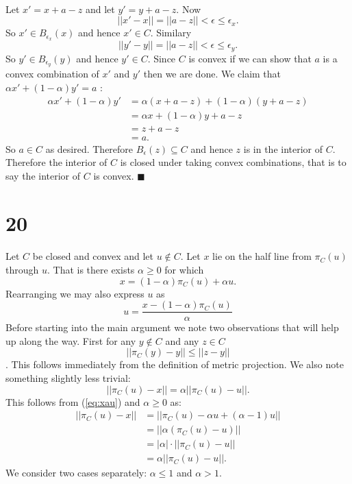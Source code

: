 \documentclass[letterpaper,12pt,oneside,onecolumn]{article}
\begin{document}
\paragraph{}
Let $x' = x + a-z$ and let $y' = y + a - z$. Now $$||x' - x|| = ||a-z|| < \epsilon \leq \epsilon_x.$$ So $x' \in B_{\epsilon_x}(x)$ and hence $x' \in C$. Similary $$||y'-y|| = ||a-z|| < \epsilon \leq \epsilon_y.$$ So $y' \in B_{\epsilon_y}(y)$ and hence $y' \in C$. Since $C$ is convex if we can show that $a$ is a convex combination of $x'$ and $y'$ then we are done. We claim that $\alpha x' + (1-\alpha)y' = a$ :
\begin{align*}
\alpha x' + (1-\alpha)y' &= \alpha(x + a - z) + (1-\alpha)(y+a-z) \\
&= \alpha x + (1-\alpha)y + a - z \\
&= z + a -z \\
&= a.
\end{align*}
So $a \in C$ as desired. Therefore $B_\epsilon(z) \subseteq C$ and hence $z$ is in the interior of $C$. Therefore the interior of $C$ is closed under taking convex combinations, that is to say the interior of $C$ is convex. $\blacksquare$
\section*{20}
\paragraph{}
Let $C$ be closed and convex and let $u \not\in C$. Let $x$ lie on the half line from $\pi_C(u)$ through $u$. That is there exists $\alpha \geq 0$ for which \begin{equation} x = (1-\alpha)\pi_C(u) + \alpha u. \label{eq:xau}\end{equation}
Rearranging we may also express $u$ as
\begin{equation} u = \frac{x - (1-\alpha) \pi_C(u)}{\alpha} \label{eq:uax}\end{equation}
Before starting into the main argument we note two observations that will help up along the way. First for any $y \not\in C$ and any $z \in C$
\begin{equation}
||\pi_C(y) - y|| \leq ||z - y||
\label{ineq:minproj}\end{equation}
. This follows immediately from the definition of metric projection. We also note something slightly less trivial:
\begin{equation}
||\pi_C(u) - x || = \alpha ||\pi_C(u) - u||. \label{eq:alphau}
\end{equation}
This follows from (\ref{eq:xau}) and $\alpha \geq 0$ as:
\begin{align*}||\pi_C(u) - x|| &= ||\pi_C(u) - \alpha u +(\alpha-1)u|| \\&= ||\alpha(\pi_C(u) - u)|| \\&= |\alpha|\cdot ||\pi_C(u) - u|| \\&= \alpha ||\pi_C(u) - u||.\end{align*}
We consider two cases separately: $\alpha \leq 1$ and $\alpha > 1$.
\end{document}
